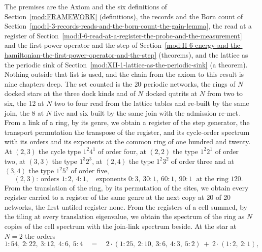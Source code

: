 \begin{chproof}[census]
The premises are the Axiom and the six definitions of Section~\ref{mod:FRAMEWORK} (definitions), the records and the Born count of Section~\ref{mod:I-3-records-reads-and-the-born-count-the-gain-lemma}, the read at a register of Section~\ref{mod:I-6-read-at-a-register-the-probe-and-the-measurement} and the first-power operator and the step of Section~\ref{mod:II-6-energy-and-the-hamiltonian-the-first-power-operator-and-the-step} (theorems), and the lattice as the periodic sink of Section~\ref{mod:XII-1-lattice-as-the-periodic-sink} (a theorem). Nothing outside that list is used, and the chain from the axiom to this result is nine chapters deep.
The set counted is the 20 periodic networks, the rings of $N$ docked stars at the three dock kinds and of $N$ docked qutrits at $N$ from two to six, the 12 at $N$ two to four read from the lattice tables and re-built by the same join, the 8 at $N$ five and six built by the same join with the admission re-met. From a link of a ring, by its genre, we obtain a register of the step generator, the transport permutation the transpose of the register, and its cycle-order spectrum with its orders and its exponents at the common ring of one hundred and twenty. At $(2,3)$ the cycle type $1^{2} 4^{1}$ of order four, at $(2,2)$ the type $1^{2} 2^{1}$ of order two, at $(3,3)$ the type $1^{3} 2^{3}$, at $(2,4)$ the type $1^{2} 3^{2}$ of order three and at $(3,4)$ the type $1^{2} 5^{2}$ of order five,
\begin{equation}
(2,3): \ \text{orders } 1\!:\!2,\ 4\!:\!1, \quad \text{exponents } 0\!:\!3,\ 30\!:\!1,\ 60\!:\!1,\ 90\!:\!1 \ \text{ at the ring } 120 .
\end{equation}
From the translation of the ring, by its permutation of the sites, we obtain every register carried to a register of the same genre at the next copy at 20 of 20 networks, the first untiled register none. From the registers of a cell summed, by the tiling at every translation eigenvalue, we obtain the spectrum of the ring as $N$ copies of the cell spectrum with the join-link spectrum beside. At the star at $N = 2$ the orders
\begin{equation}
1\!:\!54, \ 2\!:\!22, \ 3\!:\!12, \ 4\!:\!6, \ 5\!:\!4 \quad = \quad 2 \cdot (1\!:\!25, \ 2\!:\!10, \ 3\!:\!6, \ 4\!:\!3, \ 5\!:\!2) \ + \ 2 \cdot (1\!:\!2, \ 2\!:\!1) ,
\end{equation}

\end{chproof}

